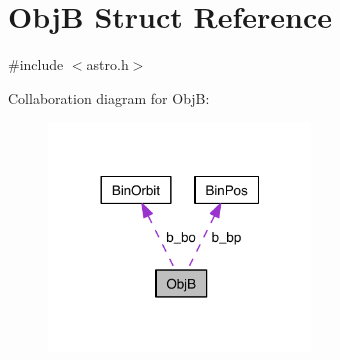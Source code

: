 \hypertarget{struct_obj_b}{\section{Obj\-B Struct Reference}
\label{struct_obj_b}
}


{\ttfamily \#include $<$astro.\-h$>$}



Collaboration diagram for Obj\-B\-:
\nopagebreak
\begin{figure}[H]
\begin{center}
\leavevmode
\includegraphics[width=197pt]{struct_obj_b__coll__graph}
\end{center}
\end{figure}
